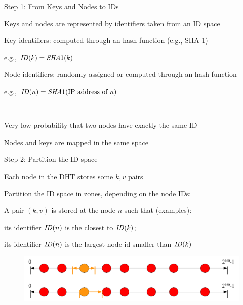 \begin{frame}{Step 1: From Keys and Nodes to IDs}

\BIL
\item Keys and nodes are represented by \alert{identifiers} taken from an \alert{ID space} 
\BI
\item Key identifiers: computed through an \alert{hash function} (e.g., SHA-1)
  \BI
  \item e.g., $\mathit{ID}(k) = \mathit{SHA}1(k)$
  \EI
\item Node identifiers: randomly assigned or computed through an hash function
  \BI
  \item e.g., $\mathit{ID}(n) =\mathit{SHA}1(\textrm{IP address of $n$})$
  \EI
\EI
\EIL

\bigskip
{}\\
\BIL
\item Very low probability that two nodes have exactly the same ID
\item Nodes and keys are mapped in the same space
\EIL

\end{frame}

\begin{frame}{Step 2: Partition the ID space}

\BIL
\item Each node in the DHT stores some $k,v$ pairs
\item Partition the ID space in zones, depending on the node IDs:
\item A pair $(k,v)$ is stored at the node $n$ such that (examples):
\BI
\item its identifier $\mathit{ID}(n)$ is the closest to $\mathit{ID}(k)$;
\item its identifier $\mathit{ID}(n)$ is the largest node id smaller than $\mathit{ID}(k)$
\EI
\EIL

\begin{figure}
	\includegraphics[width=\textwidth]{figs/10/dht-partition}
\end{figure}

\end{frame}

